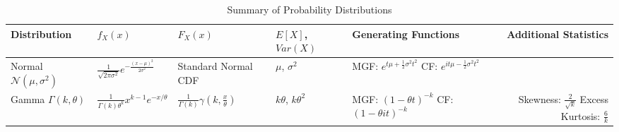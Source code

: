 \documentclass{article}
\begin{document}
\begin{landscape}
\begin{table}[ht]
\centering
\caption{Summary of Probability Distributions}
\label{tab:probability_distributions}
\begin{tabular}{@{}l p{2cm} p{4cm} p{4cm} p{2cm} r@{}}
\toprule
Distribution & $f_X(x)$ & $F_X(x)$ & $E[X]$, $Var(X)$ & Generating Functions & Additional Statistics \\ 
\midrule
Normal \newline $\mathcal{N}(\mu, \sigma^2)$ & $\frac{1}{\sqrt{2\pi \sigma^2}} e^{-\frac{(x-\mu)^2}{2\sigma^2}}$ & Standard Normal CDF & $\mu$, $\sigma^2$ & MGF: $e^{t\mu + \frac{1}{2} \sigma^2 t^2}$ \newline CF: $e^{it\mu - \frac{1}{2} \sigma^2 t^2}$ & \\
\midrule
Gamma \newline $\Gamma(k, \theta)$ & $\frac{1}{\Gamma(k) \theta^k} x^{k-1} e^{-x/\theta}$ & $\frac{1}{\Gamma(k)} \gamma \left(k, \frac{x}{\theta}\right)$ & $k\theta$, $k\theta^2$ & MGF: $(1 - \theta t)^{-k}$ \newline CF: $(1 - \theta it)^{-k}$ & Skewness: $\frac{2}{\sqrt{k}}$ \newline Excess Kurtosis: $\frac{6}{k}$ \\
\bottomrule
\end{tabular}
\end{table}
\end{landscape}
\end{document}
